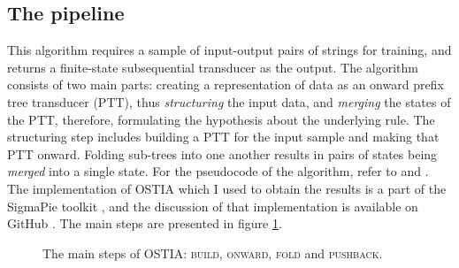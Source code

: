 \subsection{The pipeline}
\label{pipelinesec}

This algorithm requires a sample of input-output pairs of strings for training, and returns a finite-state subsequential transducer as the output.
The algorithm consists of two main parts: creating a representation of data as an onward prefix tree transducer (PTT), thus \emph{structuring} the input data, and \emph{merging} the states of the PTT, therefore, formulating the hypothesis about the underlying rule.
The structuring step includes building a PTT for the input sample and making that PTT onward.
Folding sub-trees into one another results in pairs of states being \emph{merged} into a single state.
For the pseudocode of the algorithm, refer to \cite{OncinaEtAl1993} and \cite{DeLaHiguera2010}.
The implementation of OSTIA which I used to obtain the results is a part of the SigmaPie toolkit \href{https://github.com/alenaks/SigmaPie}{\faGithub} \citep{GHsigmapie}, and the discussion of that implementation is available on GitHub \href{https://github.com/alenaks/OSTIA/blob/master/ostia.ipynb}{\faGithub} \citep{GHostia}.
The main steps are presented in figure \ref{ostiamainsteps}.

\begin{figure}[h!] 
\centering
{}
\caption{The main steps of OSTIA: \textsc{build}, \textsc{onward}, \textsc{fold} and \textsc{pushback}.}
\label{ostiamainsteps}
\end{figure}



